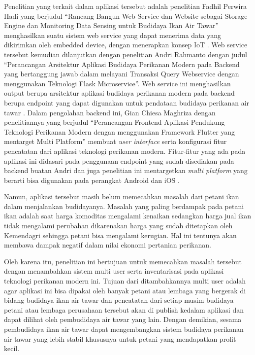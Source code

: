 Penelitian yang terkait dalam aplikasi tersebut adalah penelitian Fadhil Perwira Hadi yang berjudul “Rancang Bangun Web Service dan Website sebagai Storage Engine dan Monitoring Data Sensing untuk Budidaya Ikan Air Tawar” menghasilkan suatu sistem web service yang dapat menerima data yang dikirimkan oleh embedded device, dengan menerapkan konsep IoT \citep*{fadhil2022}. Web service tersebut kemudian dilanjutkan dengan penelitian Andri Rahmanto dengan judul “Perancangan Arsitektur Aplikasi Budidaya Perikanan Modern pada Backend yang bertanggung jawab dalam melayani Transaksi Query Webservice dengan menggunakan Teknologi Flask Microservice”. Web service ini menghasilkan output berupa arsitektur aplikasi budidaya perikanan modern pada backend berupa endpoint yang dapat digunakan untuk pendataan budidaya perikanan air tawar \citep*{andri2022}. Dalam pengolahan backend ini, Gian Chiesa Maghriza dengan penelitiannya yang berjudul “Perancangan Frontend Aplikasi Pendukung Teknologi Perikanan Modern dengan menggunakan Framework Flutter yang mentarget Multi Platform” membuat \textit{user interface} serta konfigurasi fitur pencatatan dari aplikasi teknologi perikanan modern. Fitur-fitur yang ada pada aplikasi ini didasari pada penggunaan endpoint yang sudah disediakan pada backend buatan Andri dan juga penelitian ini mentargetkan \textit{multi platform} yang berarti bisa digunakan pada perangkat Android dan iOS \citep*{gian2022}.

Namun, aplikasi tersebut masih belum memecahkan masalah dari petani ikan dalam menjalankan budidayanya. Masalah yang paling berdampak pada petani ikan adalah saat harga komoditas mengalami kenaikan sedangkan harga jual ikan tidak mengalami perubahan dikarenakan harga yang sudah ditetapkan oleh Kemendagri sehingga petani bisa mengalami kerugian. Hal ini tentunya akan membawa dampak negatif dalam nilai ekonomi pertanian perikanan.

Oleh karena itu, penelitian ini bertujuan untuk memecahkan masalah tersebut dengan menambahkan sistem multi user serta inventarisasi pada aplikasi teknologi perikanan modern ini. Tujuan dari ditambahkannya multi user adalah agar aplikasi ini bisa dipakai oleh banyak petani atau lembaga yang bergerak di bidang budidaya ikan air tawar dan pencatatan dari setiap musim budidaya petani atau lembaga perusahaan tersebut akan di publish kedalam aplikasi dan dapat dilihat oleh pembudidaya air tawar yang lain. Dengan demikian, sesama pembudidaya ikan air tawar dapat mengembangkan sistem budidaya perikanan air tawar yang lebih stabil khususnya untuk petani yang mendapatkan profit kecil. 

